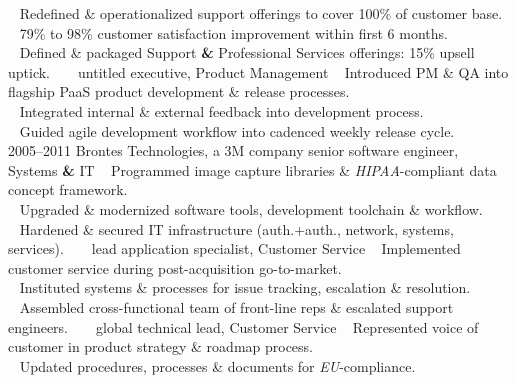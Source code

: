 \documentclass[]{friggeri-cv} %
\begin{document}
\begin{entrylist}
{{\tiny {}} ~ Redefined \& operationalized support offerings to cover 100\% of customer base.\\
{\tiny {}} ~ 79\% to 98\% customer satisfaction improvement within first 6 months.\\
{\tiny {}} ~ Defined \& packaged Support \textbf{\&} Professional Services offerings: 15\% upsell uptick.}
\entry
{~}
{~}
{untitled executive, Product Management}
{{\tiny {}} ~ Introduced PM \& QA into flagship PaaS product development \& release processes.\\
{\tiny {}} ~ Integrated internal \& external feedback into development process.\\
{\tiny {}} ~ Guided agile development workflow into cadenced weekly release cycle.\\}
\entry
{2005--2011}
{Brontes Technologies, a 3M company}
{senior software engineer, Systems \textbf{\&} IT}
{{\tiny {}} ~ Programmed image capture libraries \& \emph{HIPAA}-compliant data concept framework.\\
{\tiny {}} ~ Upgraded \& modernized software tools, development toolchain \& workflow.\\
{\tiny {}} ~ Hardened \& secured IT infrastructure (auth.+auth., network, systems, services).}
\entry
{~}
{~}
{lead application specialist, Customer Service}
{{\tiny {}} ~ Implemented customer service during post-acquisition go-to-market.\\
{\tiny {}} ~ Instituted systems \& processes for issue tracking, escalation \& resolution.\\
{\tiny {}} ~ Assembled cross-functional team of front-line reps \& escalated support engineers.}
\entry
{~}
{~}
{global technical lead, Customer Service}
{{\tiny {}} ~ Represented voice of customer  in product strategy \& roadmap process.\\
{\tiny {}} ~ Updated procedures, processes \& documents for \emph{EU}-compliance.}

\end{entrylist}
\end{document}
